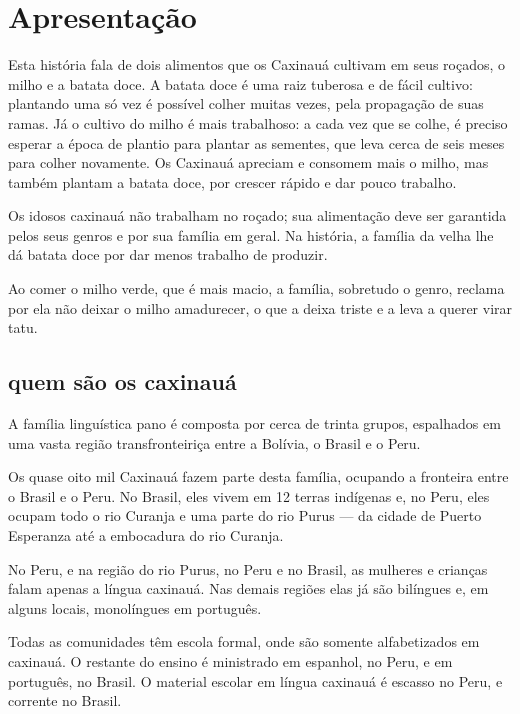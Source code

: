 \chapter{Apresentação}

Esta história fala de dois alimentos que os Caxinauá cultivam em seus roçados, o milho e a batata doce. A batata doce é uma raiz tuberosa e de fácil cultivo: plantando uma só vez é possível colher muitas vezes, pela propagação de suas ramas. Já o cultivo do milho é mais trabalhoso: a cada vez que se colhe, é preciso esperar a época de plantio para plantar as sementes, que leva cerca de seis meses para colher novamente. Os Caxinauá apreciam e consomem mais o milho, mas também plantam a batata doce, por crescer rápido e dar pouco trabalho.

Os idosos caxinauá não trabalham no roçado; sua alimentação deve ser garantida pelos seus genros e por sua família em geral. Na história, a família da velha lhe dá batata doce
por dar menos trabalho de produzir.

Ao comer o milho verde, que é mais macio, a família, sobretudo o genro, reclama por ela não deixar o milho amadurecer, o que a deixa triste e a leva a querer virar tatu.

\section{quem são os caxinauá}

A família linguística pano é composta por cerca de trinta grupos, espalhados em uma vasta região transfronteiriça entre a Bolívia, o Brasil e o Peru.

Os quase oito mil Caxinauá fazem parte desta família, ocupando a fronteira entre o Brasil
e o Peru. No Brasil, eles vivem em 12 terras indígenas e, no Peru, eles ocupam todo o rio Curanja e uma parte do rio Purus --- da cidade de Puerto Esperanza até a embocadura
do rio Curanja.

No Peru, e na região do rio Purus, no Peru e no Brasil, as mulheres e crianças falam apenas a língua caxinauá. Nas demais regiões elas já são bilíngues e, em alguns locais,
monolíngues em português.

Todas as comunidades têm escola formal, onde são somente alfabetizados em caxinauá. O
restante do ensino é ministrado em espanhol, no Peru, e em português, no Brasil. O material escolar em língua caxinauá é escasso no Peru, e corrente no Brasil.